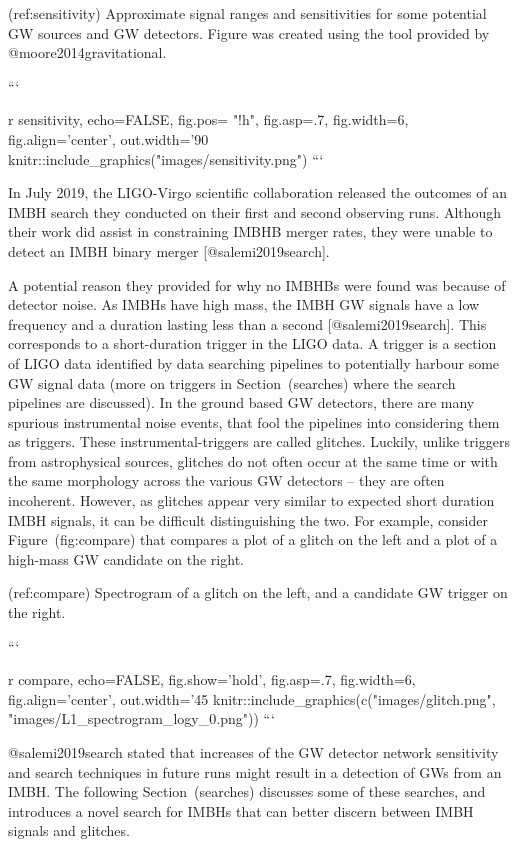 {{{{{{{{{{{{{{{{(ref:sensitivity) Approximate signal ranges and sensitivities for some potential GW sources and GW detectors. Figure was created using the tool provided by @moore2014gravitational.

```{r sensitivity, echo=FALSE, fig.pos= "!h", fig.asp=.7, fig.width=6, fig.align='center', out.width='90%
knitr::include_graphics("images/sensitivity.png")
```

In July 2019, the LIGO-Virgo scientific collaboration released the
outcomes of an IMBH search they conducted on their first and second
observing runs. Although their work did assist in constraining IMBHB
merger rates, they were unable to detect an IMBH binary merger
[@salemi2019search].

A potential reason they provided for why no IMBHBs were found was
because of detector noise. As IMBHs have high mass, the IMBH GW signals
have a low frequency and a duration lasting less than a second
[@salemi2019search]. This corresponds to a short-duration trigger in the
LIGO data. A trigger is a section of LIGO data identified by data
searching pipelines to potentially harbour some GW signal data (more on
triggers in Section~\@ref(searches) where the search pipelines are
discussed). In the ground based GW detectors, there are many spurious
instrumental noise events, that fool the pipelines into considering them
as triggers. These instrumental-triggers are called glitches. Luckily,
unlike triggers from astrophysical sources, glitches do not often occur
at the same time or with the same morphology across the various GW
detectors -- they are often incoherent. However, as glitches appear very
similar to expected short duration IMBH signals, it can be difficult
distinguishing the two. For example, consider Figure~\@ref(fig:compare)
that compares a plot of a glitch on the left and a plot of a high-mass
GW candidate on the right.


(ref:compare) Spectrogram of a glitch on the left, and a candidate GW trigger on the right.

```{r compare, echo=FALSE, fig.show='hold', fig.asp=.7, fig.width=6, fig.align='center', out.width='45%
knitr::include_graphics(c("images/glitch.png", "images/L1_spectrogram_logy_0.png"))
```


@salemi2019search stated that increases of
the GW detector network sensitivity and search techniques in future
runs might result in a detection of GWs from an IMBH. The following
Section~\@ref(searches) discusses some of these searches, and introduces
a novel search for IMBHs that can better discern between IMBH signals
and glitches.



}}}}}}}}}}}}}}}}}}
